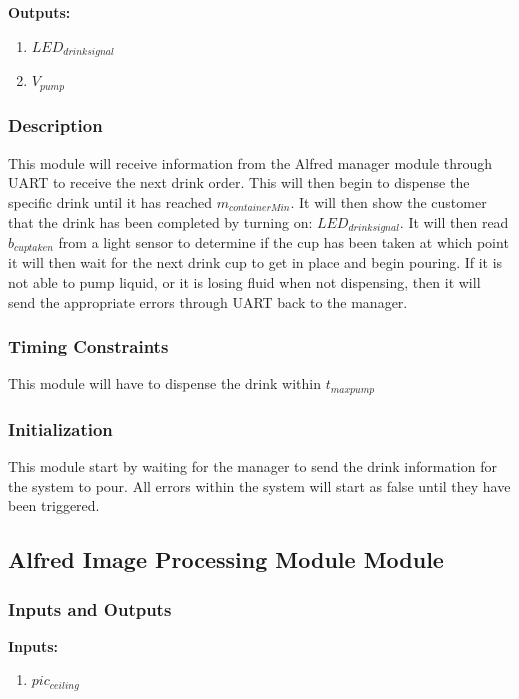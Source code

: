 \documentclass [10pt]{article}
\begin{document}
\textbf{Outputs: } 
\begin{enumerate}
	\item $ LED_{drinksignal} $
	\item $ V_{pump } $
	
\end{enumerate}

\subsubsection{Description}
This module will receive information from the Alfred manager module through UART to receive the next drink order. This will then begin to dispense the specific drink until it has reached $ m_{containerMin} $. It will then show the customer that the drink has been completed by turning on: $ LED_{drinksignal} $. It will then read $ b_{cuptaken} $ from a light sensor to determine if the cup has been taken at which point it will then wait for the next drink cup to get in place and begin pouring. If it is not able to pump liquid, or it is losing fluid when not dispensing, then it will send the appropriate errors through UART back to the manager.

\subsubsection{Timing Constraints}
This module will have to dispense the drink within $ t_{maxpump} $

\subsubsection{Initialization}
This module start by waiting for the manager to send the drink information for the system to pour. All errors within the system will start as false until they have been triggered.
\subsection{Alfred Image Processing Module Module}

\subsubsection{Inputs and Outputs}

\textbf{Inputs: } 
\begin{enumerate}
	\item $ pic_{ceiling} $
\end{enumerate}
\end{document}
